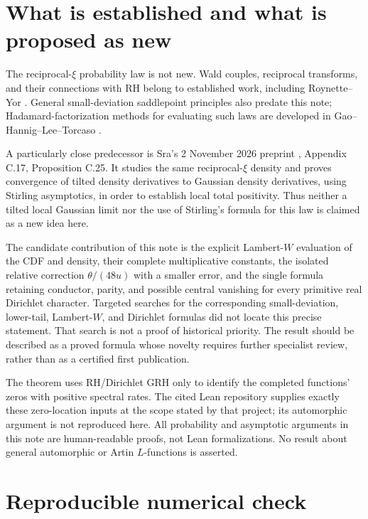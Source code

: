 \documentclass[11pt]{article}
\theoremstyle{remark}\newtheorem{remark}[theorem]{Remark}
\begin{document}
\section{What is established and what is proposed as new}

The reciprocal-$\xi$ probability law is not new. Wald couples, reciprocal
transforms, and their connections with RH belong to established work,
including Roynette--Yor \cite{roynette-yor}. General small-deviation
saddlepoint principles also predate this note; Hadamard-factorization
methods for evaluating such laws are developed in
Gao--Hannig--Lee--Torcaso \cite{gao}.

A particularly close predecessor is Sra's 2 November 2026 preprint
\cite{sra}, Appendix C.17, Proposition C.25. It studies the same
reciprocal-$\xi$ density and proves convergence of tilted density
derivatives to Gaussian density derivatives, using Stirling asymptotics,
in order to establish local total positivity. Thus neither a tilted local
Gaussian limit nor the use of Stirling's formula for this law is claimed
as a new idea here.

The candidate contribution of this note is the explicit Lambert-$W$
evaluation of the CDF and density, their complete multiplicative
constants, the isolated relative correction $\theta/(48u)$ with a
smaller error, and the single formula retaining conductor, parity, and
possible central vanishing for every primitive real Dirichlet character.
Targeted searches for the corresponding small-deviation, lower-tail,
Lambert-$W$, and Dirichlet formulas did not locate this precise statement.
That search is not a proof of historical priority. The result should be
described as a proved formula whose novelty requires further specialist
review, rather than as a certified first publication.

The theorem uses RH/Dirichlet GRH only to identify the completed functions'
zeros with positive spectral rates. The cited Lean repository
\cite{grhlean} supplies exactly these zero-location inputs at the scope
stated by that project; its automorphic argument is not reproduced here.
All probability and asymptotic arguments in this note are human-readable
proofs, not Lean formalizations. No result about general automorphic or
Artin $L$-functions is asserted.

\section{Reproducible numerical check}
\end{document}
